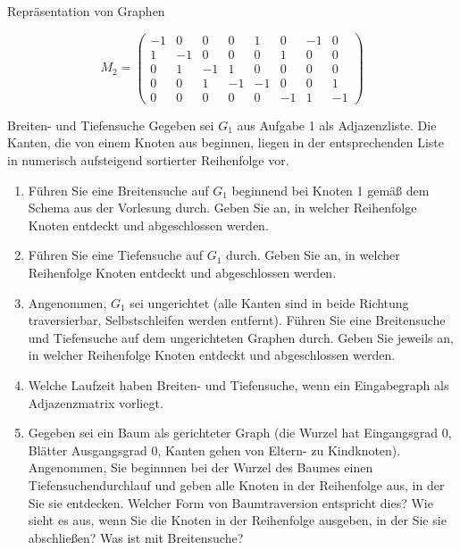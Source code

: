 \documentclass[11pt,a4paper]{article}
\begin{document}
\begin{aufgabe}{1}{Repräsentation von Graphen}
\begin{enumerate}
\begin{equation*}
            M_2 = \begin{pmatrix}
                -1 & 0 & 0 & 0 & 1 & 0 & -1 & 0 \\
                1 & -1 & 0 & 0 & 0 & 1 & 0 & 0 \\
                0 & 1 & -1 & 1 & 0 & 0 & 0 & 0 \\
                0 & 0 & 1 & -1 & -1 & 0 & 0 & 1 \\
                0 & 0 & 0 & 0 & 0 & -1 & 1 & -1
            \end{pmatrix}
        \end{equation*}
    \end{enumerate}
\end{aufgabe}

\begin{aufgabe}{2}{Breiten- und Tiefensuche}
    Gegeben sei $G_1$ aus Aufgabe 1 als Adjazenzliste.
    Die Kanten, die von einem Knoten aus beginnen, liegen in der entsprechenden Liste in numerisch aufsteigend sortierter Reihenfolge vor.
    \begin{enumerate}
        \item Führen Sie eine Breitensuche auf $G_1$ beginnend bei Knoten 1 gemäß dem Schema aus der Vorlesung durch.
        Geben Sie an, in welcher Reihenfolge Knoten ent\-deckt und abgeschlossen werden.
        \item Führen Sie eine Tiefensuche auf $G_1$ durch.
        Geben Sie an, in welcher Reihenfolge Knoten entdeckt und abgeschlossen werden.
        \item Angenommen, $G_1$ sei ungerichtet (alle Kanten sind in beide Richtung traversierbar, Selbstschleifen werden entfernt).
        Führen Sie eine Breitensuche und Tiefensuche auf dem ungerichteten Graphen durch.
        Geben Sie jeweils an, in welcher Reihenfolge Knoten entdeckt und abgeschlossen werden.
        \item Welche Laufzeit haben Breiten- und Tiefensuche, wenn ein Eingabegraph als Adjazenzmatrix vorliegt.
        \item
        Gegeben sei ein Baum als gerichteter Graph (die Wurzel hat Eingangsgrad 0, Blätter Ausgangsgrad 0, Kanten gehen von Eltern- zu Kindknoten).
        Angenommen, Sie beginnnen bei der Wurzel des Baumes einen Tiefensuchendurchlauf und geben alle Knoten in der Reihenfolge aus, in der Sie sie entdecken.
        Welcher Form von Baumtraversion entspricht dies?
        Wie sieht es aus, wenn Sie die Knoten in der Reihenfolge ausgeben, in der Sie sie abschließen?
        Was ist mit Breitensuche?

\end{enumerate}
\end{aufgabe}
\end{document}

